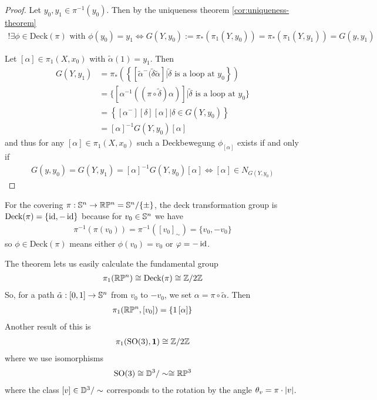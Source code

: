 \begin{proof}
  Let $y_0,y_1 \in \pi^{-1}(y_0)$. Then by the uniqueness theorem \ref{cor:uniqueness-theorem}
  \begin{align*}
    !\exists \phi \in \text{Deck}(\pi) \text{ with } \phi(y_0) = y_1 \iff G(Y,y_0) := \pi_{\ast}(\pi_1(Y,y_0))= \pi_{\ast}(\pi_1(Y,y_1)) = G(y,y_1)
  \end{align*}

  Let $[\alpha] \in \pi_1(X,x_0)$ with $\tilde{\alpha}(1) = y_1$. Then
  \begin{align*}
    G(Y,y_1) 
    &= \pi_{\ast}\left(
      \left\{
        [\tilde{\alpha}^{-} (\tilde{\delta} \tilde{\alpha}] \big\vert \tilde{\delta} \text{ is a loop at } y_0
      \right\}
    \right)\\
    &= \{\left[\alpha^{-1}\left(
        (\pi \circ \tilde{\delta}) \alpha
    \right)\right]
    \big\vert \tilde{\delta} \text{ is a loop at }y_0
  \}
  \\
    &=
    \left\{[\alpha^{-}][\delta][\alpha] \big\vert \delta \in G(Y,y_0)\right\}\\
    &=
    [\alpha]^{-1} G(Y,y_0)[\alpha]
  \end{align*}
  and thus for any $[\alpha] \in \pi_1(X,x_0)$ such a Deckbewegung $\phi_{[\alpha]}$ exists if and only if
  \begin{align*}
    G(y,y_0) = G(Y,y_1)  = [\alpha]^{-1} G(Y,y_0)[\alpha] \iff [\alpha] \in N_{G(Y,y_0)}
  \end{align*}
\end{proof}

\begin{ex}[]
For the covering $\pi: \mathbb{S}^{n} \to  \mathbb{R}\mathbb{P}^{n} = \mathbb{S}^{n}/\{\pm\}$, the deck transformation group is
$\text{Deck}(\pi) = \{\operatorname{id}, - \operatorname{id}\}$
because for $v_0 \in \mathbb{S}^{n}$ we have
\begin{align*}
  \pi^{-1}(\pi(v_0)) = \pi^{-1}([v_0]_{\sim}) = \{v_0,-v_0\}
\end{align*}
so $\phi \in \text{Deck}(\pi)$ means either $\phi(v_0) = v_0$ or $\varphi = - \operatorname{id}$.

The theorem lets us easily calculate the fundamental group
\begin{align*}
  \pi_1(\mathbb{R}\mathbb{P}^{n}) \cong \text{Deck}(\pi) \cong \mathbb{Z}/2\mathbb{Z}
\end{align*}
So, for a path $\tilde{\alpha}:[0,1] \to \mathbb{S}^{n}$ from $v_0$ to $-v_0$, we set $\alpha = \pi \circ \tilde{\alpha}$.
Then
\begin{align*}
  \pi_1(\mathbb{R}\mathbb{P}^{n},[v_0]) = \{1\, [\alpha]\}
\end{align*}
Another result of this is
\begin{align*}
  \pi_1(\text{SO}(3),\bm{1}) \cong \mathbb{Z}/2\mathbb{Z}
\end{align*}
where we use isomorphisms
\begin{align*}
  \text{SO}(3) \cong \mathbb{D}^{3}/\sim \cong \mathbb{R}\mathbb{P}^{3}
\end{align*}
where the class $[v] \in \mathbb{D}^{3}/\sim$ corresponds to the rotation by the angle $\theta_v = \pi \cdot \vert v\vert$.
\end{ex}


